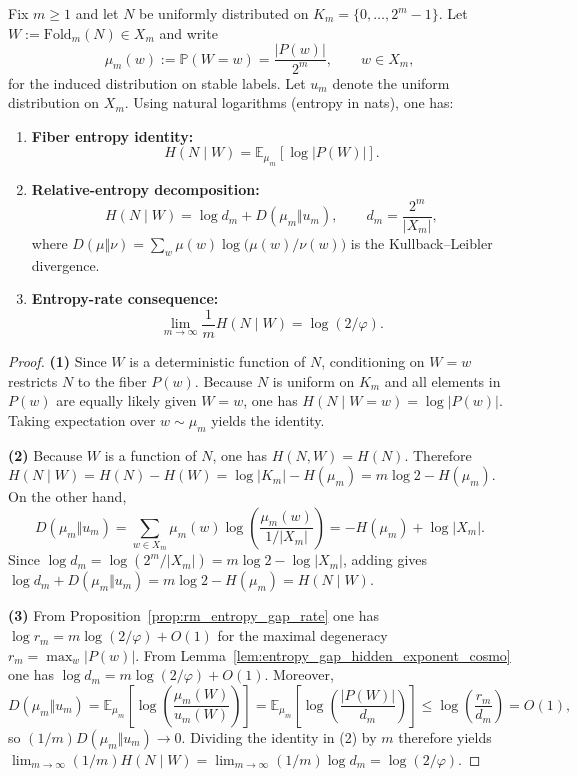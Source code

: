 \begin{proposition}\label{prop:folding_relative_entropy_decomposition}
\MathTag Fix $m\ge 1$ and let $N$ be uniformly distributed on $K_m=\{0,\dots,2^m-1\}$.
Let $W:=\mathrm{Fold}_m(N)\in X_m$ and write
\[
\mu_m(w):=\mathbb{P}(W=w)=\frac{|P(w)|}{2^m},\qquad w\in X_m,
\]
for the induced distribution on stable labels.
Let $u_m$ denote the uniform distribution on $X_m$.
Using natural logarithms (entropy in nats), one has:
\begin{enumerate}
\item \textbf{Fiber entropy identity:}
\[
H(N\mid W)=\mathbb{E}_{\mu_m}\!\left[\log |P(W)|\right].
\]
\item \textbf{Relative-entropy decomposition:}
\[
H(N\mid W)=\log d_m + D(\mu_m\Vert u_m),
\qquad
d_m=\frac{2^m}{|X_m|},
\]
where $D(\mu\Vert\nu)=\sum_w \mu(w)\log\!\bigl(\mu(w)/\nu(w)\bigr)$ is the Kullback--Leibler divergence.
\item \textbf{Entropy-rate consequence:}
\[
\lim_{m\to\infty}\frac{1}{m}H(N\mid W)=\log(2/\varphi).
\]
\end{enumerate}
\end{proposition}
\begin{proof}
\textbf{(1)} Since $W$ is a deterministic function of $N$, conditioning on $W=w$ restricts $N$ to the fiber $P(w)$.
Because $N$ is uniform on $K_m$ and all elements in $P(w)$ are equally likely given $W=w$, one has $H(N\mid W=w)=\log|P(w)|$.
Taking expectation over $w\sim \mu_m$ yields the identity.
\par
\textbf{(2)} Because $W$ is a function of $N$, one has $H(N,W)=H(N)$.
Therefore $H(N\mid W)=H(N)-H(W)=\log|K_m|-H(\mu_m)=m\log 2-H(\mu_m)$.
On the other hand,
\[
D(\mu_m\Vert u_m)
=\sum_{w\in X_m}\mu_m(w)\log\!\left(\frac{\mu_m(w)}{1/|X_m|}\right)
=-H(\mu_m)+\log|X_m|.
\]
Since $\log d_m=\log(2^m/|X_m|)=m\log 2-\log|X_m|$, adding gives
$\log d_m+D(\mu_m\Vert u_m)=m\log 2-H(\mu_m)=H(N\mid W)$.
\par
\textbf{(3)} From Proposition~\ref{prop:rm_entropy_gap_rate} one has $\log r_m=m\log(2/\varphi)+O(1)$ for the maximal degeneracy $r_m=\max_w|P(w)|$.
From Lemma~\ref{lem:entropy_gap_hidden_exponent_cosmo} one has $\log d_m=m\log(2/\varphi)+O(1)$.
Moreover,
\[
D(\mu_m\Vert u_m)=\mathbb{E}_{\mu_m}\!\left[\log\!\left(\frac{\mu_m(W)}{u_m(W)}\right)\right]
=\mathbb{E}_{\mu_m}\!\left[\log\!\left(\frac{|P(W)|}{d_m}\right)\right]
\le \log\!\left(\frac{r_m}{d_m}\right)=O(1),
\]
so $(1/m)D(\mu_m\Vert u_m)\to 0$.
Dividing the identity in (2) by $m$ therefore yields
$
\lim_{m\to\infty} (1/m)H(N\mid W)=\lim_{m\to\infty}(1/m)\log d_m=\log(2/\varphi).
$
\end{proof}

